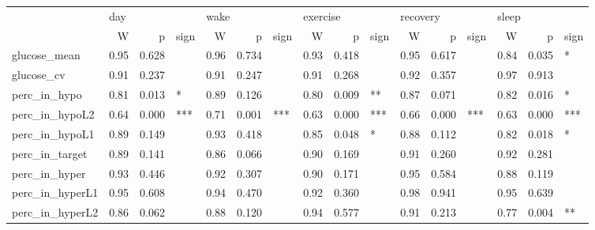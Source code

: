 \begin{tabular}{lrrlrrlrrlrrlrrl}
\toprule
{} & \multicolumn{3}{l}{day} & \multicolumn{3}{l}{wake} & \multicolumn{3}{l}{exercise} & \multicolumn{3}{l}{recovery} & \multicolumn{3}{l}{sleep} \\
{} &     W &      p & sign &     W &      p & sign &        W &      p & sign &        W &      p & sign &     W &      p & sign \\
\midrule
glucose_mean    &  0.95 &  0.628 &      &  0.96 &  0.734 &      &     0.93 &  0.418 &      &     0.95 &  0.617 &      &  0.84 &  0.035 &    * \\
glucose_cv      &  0.91 &  0.237 &      &  0.91 &  0.247 &      &     0.91 &  0.268 &      &     0.92 &  0.357 &      &  0.97 &  0.913 &      \\
perc_in_hypo    &  0.81 &  0.013 &    * &  0.89 &  0.126 &      &     0.80 &  0.009 &   ** &     0.87 &  0.071 &      &  0.82 &  0.016 &    * \\
perc_in_hypoL2  &  0.64 &  0.000 &  *** &  0.71 &  0.001 &  *** &     0.63 &  0.000 &  *** &     0.66 &  0.000 &  *** &  0.63 &  0.000 &  *** \\
perc_in_hypoL1  &  0.89 &  0.149 &      &  0.93 &  0.418 &      &     0.85 &  0.048 &    * &     0.88 &  0.112 &      &  0.82 &  0.018 &    * \\
perc_in_target  &  0.89 &  0.141 &      &  0.86 &  0.066 &      &     0.90 &  0.169 &      &     0.91 &  0.260 &      &  0.92 &  0.281 &      \\
perc_in_hyper   &  0.93 &  0.446 &      &  0.92 &  0.307 &      &     0.90 &  0.171 &      &     0.95 &  0.584 &      &  0.88 &  0.119 &      \\
perc_in_hyperL1 &  0.95 &  0.608 &      &  0.94 &  0.470 &      &     0.92 &  0.360 &      &     0.98 &  0.941 &      &  0.95 &  0.639 &      \\
perc_in_hyperL2 &  0.86 &  0.062 &      &  0.88 &  0.120 &      &     0.94 &  0.577 &      &     0.91 &  0.213 &      &  0.77 &  0.004 &   ** \\
\bottomrule
\end{tabular}
